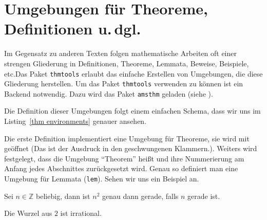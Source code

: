 
\section{Umgebungen für Theoreme, Definitionen u.\,dgl.}

Im Gegensatz zu anderen Texten folgen mathematische Arbeiten oft einer strengen Gliederung in Definitionen, Theoreme, Lemmata, Beweise, Beispiele, etc.\@ Das Paket \texttt{thmtools} erlaubt das einfache Erstellen von Umgebungen, die diese Gliederung herstellen.
Um das Paket \texttt{thmtools} verwenden zu können ist ein Backend notwendig.
Dazu wird das Paket \texttt{amsthm} geladen (siehe \cite{amsthm}).


Die Definition dieser Umgebungen folgt einem einfachen Schema, dass wir uns im Listing~\ref{thm environments} genauer ansehen.

\begin{figure*}
\begin{example}[caption={Beispiel für die Definition von Theoremumgebungen},
label={thm environments}]
\usepackage{amsthm} %
\usepackage{thmtools}

	
\end{example}
\end{figure*}

Die erste Definition implementiert eine Umgebung für Theoreme, sie wird mit  geöffnet (Das ist der Ausdruck in den geschwungenen Klammern.).
Weiters wird festgelegt, dass die Umgebung "`Theorem"' heißt und ihre Nummerierung am Anfang jedes Abschnittes zurückgesetzt wird.
Genau so definiert man eine Umgebung für Lemmata (\texttt{lem}). Sehen wir uns ein Beispiel an.

\begin{LTXexample}[firstline=3]
\setcounter{thm}{0}
\setcounter{lem0}{0}
\begin{lem0}
    Sei $n \in \mathbb Z$ 
    beliebig, dann ist $n^2$ 
    genau dann gerade, 
    falls $n$ gerade ist.
\end{lem0}

\begin{thm}
    Die Wurzel aus $2$ ist 
    irrational.
\end{thm}
\end{LTXexample}

